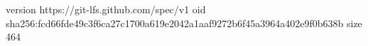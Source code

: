 version https://git-lfs.github.com/spec/v1
oid sha256:fcd66fde49c3f6ca27c1700a619e2042a1aaf9272b6f45a3964a402e9f0b638b
size 464
